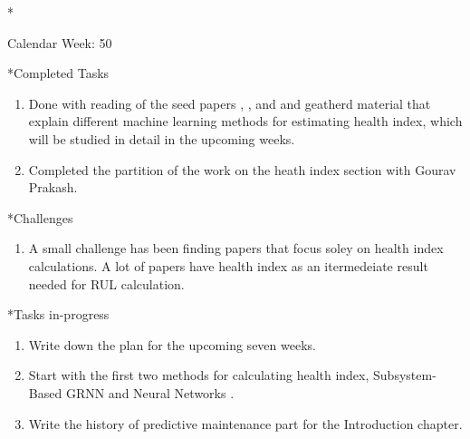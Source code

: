 \documentclass[11pt,a4paper]{article}
\begin{document}
\newpage
\begin{section}*{Calendar Week: 50 \hfill \date{11 December, 2020}}
 \begin{refsection}

       \begin{subsection}*{Completed Tasks}
             \begin{enumerate}
                   \item
                         Done with reading of the seed papers \cite{8097036}, \cite{7377088}, and \cite{malhotra2016multisensor} and
                         geatherd material that explain different machine learning methods for estimating health index, which will be
                         studied in detail in the upcoming weeks.
                   \item
                         Completed the partition of the work on the heath index section with Gourav Prakash.
             \end{enumerate}
       \end{subsection}

       \begin{subsection}*{Challenges}
             \begin{enumerate}
                   \item
                         A small challenge has been finding papers that focus soley on health index calculations.
                         A lot of papers have health index as an itermedeiate result needed for RUL calculation.
             \end{enumerate}
       \end{subsection}

       \begin{subsection}*{Tasks in-progress}
             \begin{enumerate}
                   \item
                         Write down the plan for the upcoming seven weeks.
                   \item
                         Start with the first two methods for calculating health index, Subsystem-Based GRNN
                         \cite{8097036} and Neural Networks \cite{7377088}.
                   \item Write the history of predictive maintenance part for the Introduction chapter.
             \end{enumerate}
       \end{subsection}

       \printbibliography
 \end{refsection}
\end{section}
\end{document}
